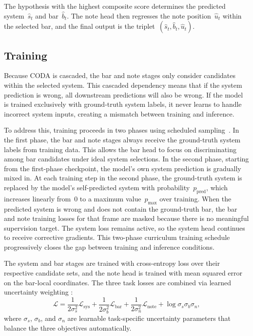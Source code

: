 The hypothesis with the highest composite score determines the predicted system~$\hat{s}_t$ and bar~$\hat{b}_t$. The note head then regresses the note position~$\hat{u}_t$ within the selected bar, and the final output is the triplet~$(\hat{s}_t, \hat{b}_t, \hat{u}_t)$.

\subsection{Training}

Because CODA is cascaded, the bar and note stages only consider candidates within the selected system. This cascaded dependency means that if the system prediction is wrong, all downstream predictions will also be wrong. If the model is trained exclusively with ground-truth system labels, it never learns to handle incorrect system inputs, creating a mismatch between training and inference.

To address this, training proceeds in two phases using scheduled sampling~\cite{bengio2015scheduled}. In the first phase, the bar and note stages always receive the ground-truth system labels from training data. This allows the bar head to focus on discriminating among bar candidates under ideal system selections. In the second phase, starting from the first-phase checkpoint, the model's own system prediction is gradually mixed in. At each training step in the second phase, the ground-truth system is replaced by the model's self-predicted system with probability~$p_{\mathrm{pred}}$, which increases linearly from~0 to a maximum value~$p_{\max}$ over training. When the predicted system is wrong and does not contain the ground-truth bar, the bar and note training losses for that frame are masked because there is no meaningful supervision target. The system loss remains active, so the system head continues to receive corrective gradients. This two-phase curriculum training schedule progressively closes the gap between training and inference conditions.

The system and bar stages are trained with cross-entropy loss over their respective candidate sets, and the note head is trained with mean squared error on the bar-local coordinates. The three task losses are combined via learned uncertainty weighting \cite{kendall2018multi}:
\begin{equation}\label{eq:loss}
\mathcal{L} = \frac{1}{2\sigma_s^2}\mathcal{L}_{\mathrm{sys}} + \frac{1}{2\sigma_b^2}\mathcal{L}_{\mathrm{bar}} + \frac{1}{2\sigma_n^2}\mathcal{L}_{\mathrm{note}} + \log \sigma_s \sigma_b \sigma_n,
\end{equation}
where $\sigma_s$, $\sigma_b$, and $\sigma_n$ are learnable task-specific uncertainty parameters that balance the three objectives automatically.

